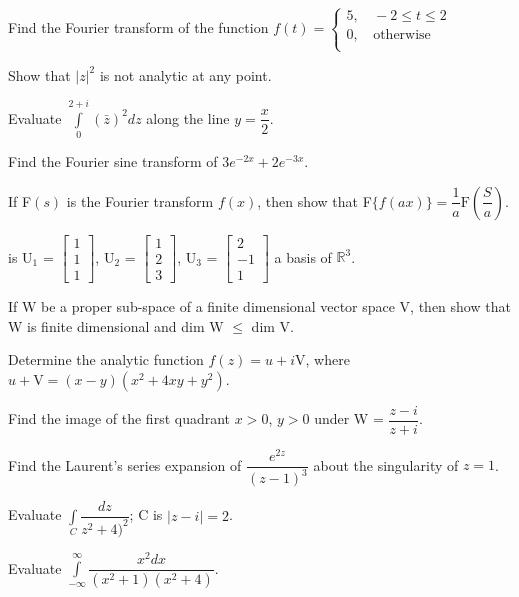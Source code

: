 \item Find the Fourier transform of the function
  $f(t) = 
  \begin{cases}
    5, & \, -2 \leq t \leq  2\\
    0, & \, \text{otherwise}\\
  \end{cases}$

\markA
\partB

\item Show that $|z|^2$ is not analytic at any point.
\item Evaluate $\int\limits_0^{2+i} (\bar{z})^2dz$ along the line
  $y = \dfrac{x}{2}$.
\item Find the Fourier sine transform of $3e^{-2x} + 2e^{-3x}$.
\item If F$(s)$ is the Fourier transform $f(x)$, then show that
  F$\{f(ax)\} = \dfrac{1}{a} \text{F}\left(\dfrac{S}{a}\right)$.
\item is U$_1$ = $\begin{bmatrix} 1\\ 1\\ 1 \end{bmatrix} $,
  U$_2$ = $\begin{bmatrix} 1\\ 2\\ 3 \end{bmatrix} $,
  U$_3$ = $\begin{bmatrix} 2\\ -1\\ 1 \end{bmatrix} $
  a basis of $\mathbb{R}^3$.
\item If W be a proper sub-space of a finite dimensional vector space
  V, then show that W is finite dimensional and dim W $\leq$ dim V.

\markB

\newpage \again

\partC

\item \iitem Determine the analytic function $f(z) = u + i\text{V}$, where
  $u + \text{V} = (x - y) (x^2 + 4xy + y^2)$.
\Or
\item Find the image of the first quadrant $x > 0$, $y > 0$ under
W = $\dfrac {z-i}{z+i}$.
\ene

\item \iitem \iitem Find the Laurent's series expansion of
  $\dfrac{e^{2z}}{(z-1)^3}$ about the singularity of $z = 1$.
\item Evaluate $\int\limits_C \dfrac{dz}{z^2 + 4)^2}$; C is $|z - i| = 2$.
\ene
\Or
\item Evaluate $\int\limits_{-\infty}^{\infty} \dfrac{x^2 dx}{(x^2 + 1) (x^2 + 4)}$.
\ene

